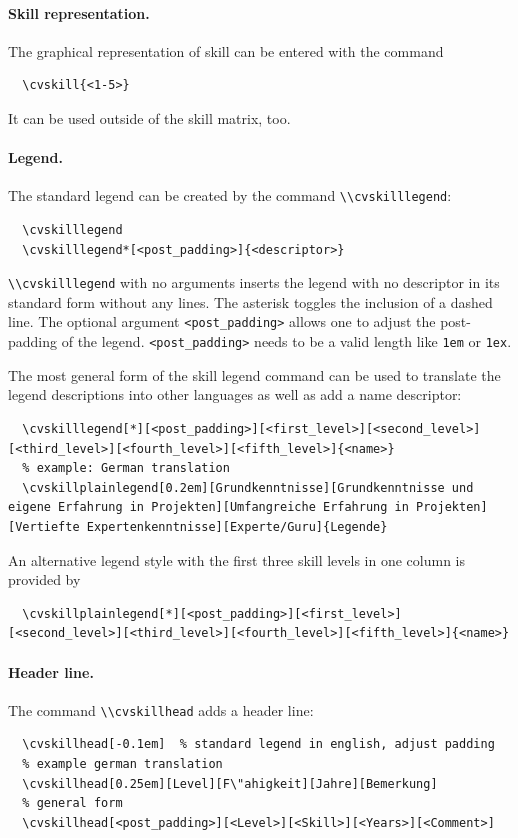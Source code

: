 \documentclass[a4paper, 11pt]{article}
\newcommand{\code}[1]{\lstinline!#1!}
\begin{document}
\paragraph{Skill representation.}
The graphical representation of skill can be entered with the command
\begin{lstlisting}
  \cvskill{<1-5>}
\end{lstlisting}
It can be used outside of the skill matrix, too.

\paragraph{Legend.}
The standard legend can be created by the command \code{\\cvskilllegend}:
\begin{lstlisting}
  \cvskilllegend
  \cvskilllegend*[<post_padding>]{<descriptor>}
\end{lstlisting}
\code{\\cvskilllegend} with no arguments inserts the legend with no descriptor in its standard form without any lines.
The asterisk toggles the inclusion of a dashed line.
The optional argument \code{<post_padding>} allows one to adjust the post-padding of the legend.
\code{<post_padding>} needs to be a valid length like \code{1em} or \code{1ex}.

The most general form of the skill legend command can be used to translate the legend descriptions into other languages as well as add a name descriptor:
\begin{lstlisting}
  \cvskilllegend[*][<post_padding>][<first_level>][<second_level>][<third_level>][<fourth_level>][<fifth_level>]{<name>}
  % example: German translation
  \cvskillplainlegend[0.2em][Grundkenntnisse][Grundkenntnisse und eigene Erfahrung in Projekten][Umfangreiche Erfahrung in Projekten][Vertiefte Expertenkenntnisse][Experte/Guru]{Legende}
\end{lstlisting}
An alternative legend style with the first three skill levels in one column is provided by
\begin{lstlisting}
  \cvskillplainlegend[*][<post_padding>][<first_level>][<second_level>][<third_level>][<fourth_level>][<fifth_level>]{<name>}
\end{lstlisting}

\paragraph{Header line.}
The command \code{\\cvskillhead} adds a header line:
\begin{lstlisting}
  \cvskillhead[-0.1em]  % standard legend in english, adjust padding
  % example german translation
  \cvskillhead[0.25em][Level][F\"ahigkeit][Jahre][Bemerkung]
  % general form
  \cvskillhead[<post_padding>][<Level>][<Skill>][<Years>][<Comment>]
\end{lstlisting}
\end{document}
